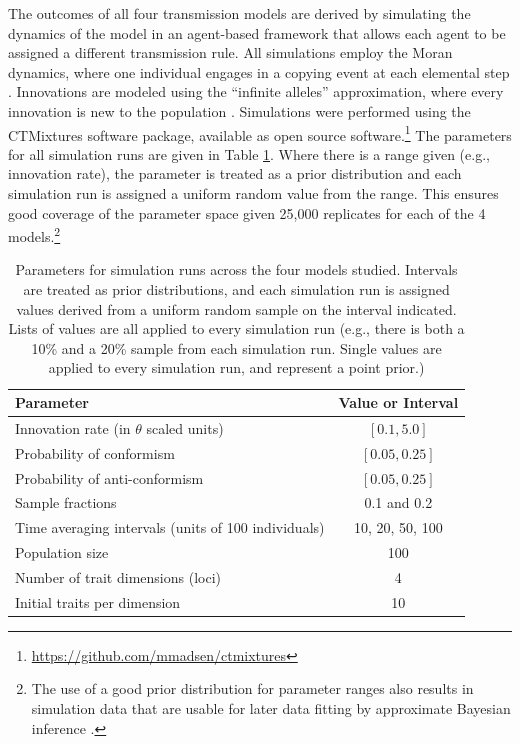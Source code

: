 \documentclass[10pt,letterpaper]{article}
\begin{document}
The outcomes of all four transmission models are derived by simulating the
dynamics of the model in an agent-based framework that allows each agent to be assigned a different transmission rule.  All simulations employ
the Moran dynamics, where one individual engages in a copying event at
each elemental step
\cite{moran1962statistical, moran1958random, aoki2011rates}.
Innovations are modeled using the ``infinite alleles'' approximation,
where every innovation is new to the population \cite{Ewens2004}.
Simulations were performed using the CTMixtures software package,
available as open source
software.\footnote{\url{https://github.com/mmadsen/ctmixtures}} The
parameters for all simulation runs are given in Table
\ref{tab:parameters}. Where there is a range given (e.g., innovation
rate), the parameter is treated as a prior distribution and each
simulation run is assigned a uniform random value from the range. This
ensures good coverage of the parameter space given 25,000 replicates for
each of the 4
models.\footnote{The use of a good prior distribution for parameter ranges also results in simulation data that are usable for later data fitting by approximate Bayesian inference \cite{Beaumont:2010ur, Crema:2014ef, Csillery:2010jd, marin2012}.}

\begin{table}[h]
\begin{tabular}{lc}
\hline
Parameter & Value or Interval \\ 
\hline
Innovation rate (in $\theta$ scaled units)  & $[0.1, 5.0]$   \\
Probability of conformism & $[0.05, 0.25]$ \\
Probability of anti-conformism & $[0.05, 0.25]$ \\
Sample fractions & 0.1 and 0.2 \\
Time averaging intervals (units of 100 individuals) & 10, 20, 50, 100 \\
Population size & 100 \\
Number of trait dimensions (loci) & 4 \\
Initial traits per dimension & 10 \\
\hline
\end{tabular}

\caption{Parameters for simulation runs across the four models studied.  Intervals are treated as prior distributions, and each simulation run is assigned values derived from a uniform random sample on the interval indicated.  Lists of values are all applied to every simulation run (e.g., there is both a 10\% and a 20\% sample from each simulation run.  Single values are applied to every simulation run, and represent a point prior.)}
\label{tab:parameters}
\end{table}
\end{document}
